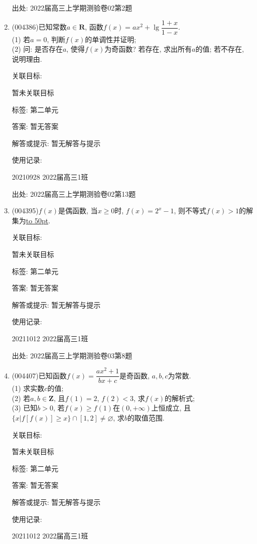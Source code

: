 \documentclass[10pt,a4paper]{article}
\newcommand{\blank}[1]{\underline{\hbox to #1pt{}}}
\begin{document}
\begin{enumerate}[1.]
出处: 2022届高三上学期测验卷02第2题
\item { (004386)}已知常数$a\in \mathbf{R}$, 函数$f(x)=ax^2+\lg \dfrac{1+x}{1-x}$.\\
(1) 若$a=0$, 判断$f(x)$的单调性并证明;\\
(2) 问: 是否存在$a$, 使得$f(x)$为奇函数? 若存在, 求出所有$a$的值; 若不存在, 说明理由.


关联目标:

暂未关联目标



标签: 第二单元

答案: 暂无答案

解答或提示: 暂无解答与提示

使用记录:

20210928	2022届高三1班		


出处: 2022届高三上学期测验卷02第13题
\item { (004395)}$f(x)$是偶函数, 当$x\ge 0$时, $f(x)=2^x-1$, 则不等式$f(x)>1$的解集为\blank{50}.


关联目标:

暂未关联目标



标签: 第二单元

答案: 暂无答案

解答或提示: 暂无解答与提示

使用记录:

20211012	2022届高三1班	


出处: 2022届高三上学期测验卷03第8题
\item { (004407)}已知函数$f(x)=\dfrac{ax^2+1}{bx+c}$是奇函数, $a,b,c$为常数.\\
(1)	求实数$c$的值;\\
(2)	若$a,b\in \mathbf{Z}$, 且$f(1)=2$, $f(2)<3$, 求$f(x)$的解析式;\\
(3) 已知$b>0$, 若$f(x)\ge f(1)$在$(0,+\infty)$上恒成立, 且$\{x|f[f(x)]\ge x\}\cap [1,2]\ne \varnothing$, 求$b$的取值范围.


关联目标:

暂未关联目标



标签: 第二单元

答案: 暂无答案

解答或提示: 暂无解答与提示

使用记录:

20211012	2022届高三1班			



\end{enumerate}
\end{document}
